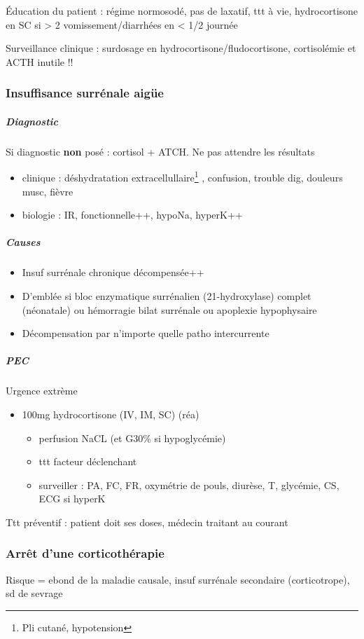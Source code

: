 \documentclass[11pt]{article}
\begin{document}
Éducation du patient : régime normosodé, pas de laxatif, ttt à vie, hydrocortisone en SC si > 2 vomissement/diarrhées en < 1/2 journée

Surveillance clinique : surdosage en hydrocortisone/fludocortisone, cortisolémie et ACTH inutile !!

\subsubsection{Insuffisance surrénale aigüe}
\label{sec:org892a0b5}

\subparagraph{Diagnostic}
\label{sec:org2a2b6d8}
Si diagnostic \textbf{non} posé : cortisol + ATCH. Ne pas attendre les résultats \faBomb
\begin{itemize}
\item clinique : déshydratation extracellullaire\footnote{Pli cutané, hypotension} , confusion, trouble dig, douleurs musc, fièvre
\item biologie : IR, fonctionnelle++, hypoNa, hyperK++
\end{itemize}

\subparagraph{Causes}
\label{sec:orgda277e2}
\begin{itemize}
\item Insuf surrénale chronique décompensée++
\item D'emblée si bloc enzymatique surrénalien (21-hydroxylase) complet (néonatale)
ou hémorragie bilat surrénale ou apoplexie hypophysaire
\item Décompensation par n'importe quelle patho intercurrente
\end{itemize}

\subparagraph{PEC}
\label{sec:org8b14714}
\danger Urgence extrème \faBomb
\begin{itemize}
\item 100mg hydrocortisone (IV, IM, SC) \thus \faHospitalO (réa)
\begin{itemize}
\item perfusion NaCL (et G30\% si hypoglycémie)
\item ttt facteur déclenchant
\item surveiller : PA, FC, FR, oxymétrie de pouls, diurèse, T, glycémie, CS, ECG
si hyperK
\end{itemize}
\end{itemize}

Ttt préventif : patient doit \inc ses doses, médecin traitant au courant

\subsubsection{Arrêt d'une corticothérapie}
\label{sec:org5136838}
Risque = ebond de la maladie causale, insuf surrénale secondaire (corticotrope), sd de sevrage
\end{document}
